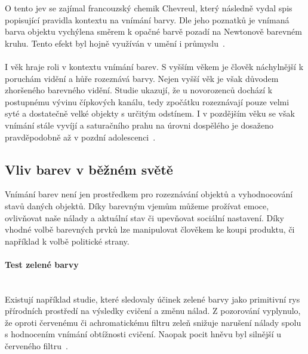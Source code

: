O tento jev se zajímal francouzský chemik Chevreul, který následně vydal spis popisující pravidla kontextu na vnímání barvy.
Dle jeho poznatků je vnímaná barva objektu vychýlena směrem k opačné barvě pozadí na Newtonově barevném kruhu. Tento efekt byl hojně
využíván v umění i průmyslu~\cite{BEAULOTTO2002609}.
\\
\\
I věk hraje roli v kontextu vnímání barev. S vyšším věkem je člověk náchylnější k poruchám vidění a hůře rozeznává barvy. Nejen vyšší věk
je však důvodem zhoršeného barevného vidění. Studie ukazují, že u novorozenců dochází k postupnému vývinu čípkových kanálu, tedy zpočátku
rozeznávají pouze velmi syté a dostatečně velké objekty s určitým odstínem. I v pozdějším věku se však vnímání stále vyvíjí a saturačního prahu
na úrovni dospělého je dosaženo pravděpodobně až v pozdní adolescenci~\cite{infant-perception}.


\subsection{Vliv barev v běžném světě}
Vnímání barev není jen prostředkem pro rozeznávání objektů a vyhodnocování stavů daných objektů. Díky barevným vjemům můžeme
prožívat emoce, ovlivňovat naše nálady a aktuální stav či upevňovat sociální nastavení. Díky vhodné volbě barevných prvků lze
manipulovat člověkem ke koupi produktu, či například k volbě politické strany.
\paragraph{Test zelené barvy}\mbox{}\\
Existují například studie, které sledovaly účinek zelené barvy jako primitivní rys přírodních prostředí na výsledky cvičení a změnu
nálad. Z pozorování vyplynulo, že oproti červenému či achromatickému filtru zeleň snižuje narušení nálady spolu s hodnocením
vnímání obtížnosti cvičení. Naopak pocit hněvu byl silnější u červeného filtru~\cite{Akers2012}.
